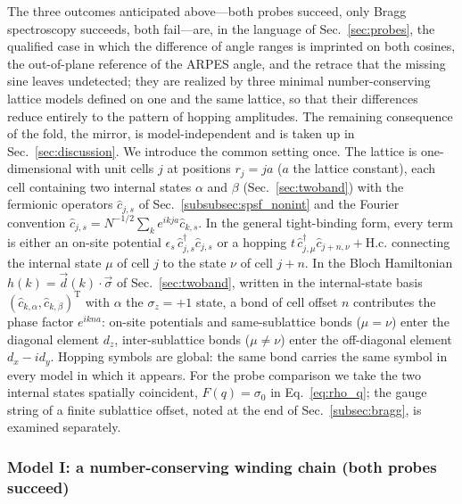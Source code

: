 \documentclass[onecolumn,aps,prl,superscriptaddress,longbibliography]{revtex4-2}
\begin{document}
The three outcomes anticipated above---both probes succeed, only Bragg spectroscopy succeeds, both fail---are, in the language of Sec.~\ref{sec:probes}, the qualified case in which the difference of angle ranges is imprinted on both cosines, the out-of-plane reference of the ARPES angle, and the retrace that the missing sine leaves undetected; they are realized by three minimal number-conserving lattice models defined on one and the same lattice, so that their differences reduce entirely to the pattern of hopping amplitudes. The remaining consequence of the fold, the mirror, is model-independent and is taken up in Sec.~\ref{sec:discussion}. We introduce the common setting once. The lattice is one-dimensional with unit cells $j$ at positions $r_j=ja$ ($a$ the lattice constant), each cell containing two internal states $\alpha$ and $\beta$ (Sec.~\ref{sec:twoband}) with the fermionic operators $\hat{c}_{j,s}$ of Sec.~\ref{subsubsec:spsf_nonint} and the Fourier convention $\hat{c}_{j,s}=N^{-1/2}\sum_k e^{ikja}\hat{c}_{k,s}$. In the general tight-binding form, every term is either an on-site potential $\epsilon_s\,\hat{c}_{j,s}^{\dagger}\hat{c}_{j,s}$ or a hopping $t\,\hat{c}_{j,\mu}^{\dagger}\hat{c}_{j+n,\nu}+\mathrm{H.c.}$ connecting the internal state $\mu$ of cell $j$ to the state $\nu$ of cell $j+n$. In the Bloch Hamiltonian $h(k)=\vec{d}(k)\cdot\vec{\sigma}$ of Sec.~\ref{sec:twoband}, written in the internal-state basis $(\hat{c}_{k,\alpha},\hat{c}_{k,\beta})^{\mathrm{T}}$ with $\alpha$ the $\sigma_z=+1$ state, a bond of cell offset $n$ contributes the phase factor $e^{ikna}$: on-site potentials and same-sublattice bonds ($\mu=\nu$) enter the diagonal element $d_z$, inter-sublattice bonds ($\mu\neq\nu$) enter the off-diagonal element $d_x-id_y$. Hopping symbols are global: the same bond carries the same symbol in every model in which it appears. For the probe comparison we take the two internal states spatially coincident, $F(q)=\sigma_0$ in Eq.~\eqref{eq:rho_q}; the gauge string of a finite sublattice offset, noted at the end of Sec.~\ref{subsec:bragg}, is examined separately.

\subsubsection{Model I: a number-conserving winding chain (both probes succeed)}\label{subsubsec:modelI}
\end{document}
